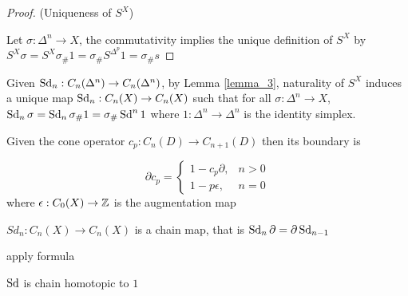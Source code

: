 \documentclass{report}
\begin{document}
\begin{proof}
    (Uniqueness of $S^X$)

    \begin{center}
    \end{center}

Let $\sigma: \Delta^n \to X$, the commutativity implies the unique definition of $S^X$ by $S^X \sigma = S^X \sigma_\# 1 = \sigma_\# S^{\Delta^p} 1 = \sigma_\# s$
\end{proof}


\begin{definition}
    Given $\operatorname{Sd}_n: C_n(\Delta^n) \to C_n(\Delta^n)$, by Lemma \ref{lemma_3}, naturality of $S^X$ induces a unique map $\operatorname{Sd}_n: C_n(X) \to C_n(X)$ such that for all $\sigma: \Delta^n \to X$, $\operatorname{Sd}_n \sigma = \operatorname{Sd}_n \sigma_\# 1 = \sigma_\# \operatorname{Sd}^n 1$ where $1: \Delta^n \to \Delta^n$ is the identity simplex.
\end{definition}

\begin{proposition}
Given the cone operator $c_p: C_n(D) \to C_{n+1}(D)$ then its boundary is

$$
    \partial c_p = \begin{cases}
        1 - c_p \partial, &n > 0 \\
        1 - p \epsilon, &n = 0
    \end{cases}
$$
where $\epsilon: C_0(X) \to \mathbb{Z}$ is the augmentation map
\end{proposition}

\begin{proposition}
    $Sd_n: C_n(X) \to C_n(X)$ is a chain map, that is $\operatorname{Sd}_n \partial = \partial \operatorname{Sd}_{n-1}$
\end{proposition}

apply formula

\begin{proposition}
    $\operatorname{Sd}$ is chain homotopic to $1$
\end{proposition}
\end{document}
